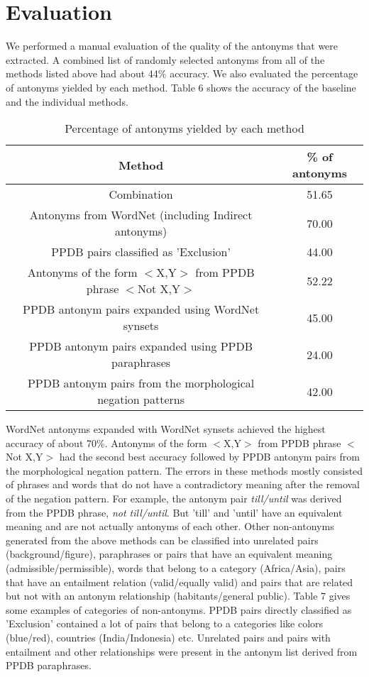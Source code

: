 \documentclass[11pt]{article}
\begin{document}
\section{Evaluation}
We performed a manual evaluation of the quality of the antonyms that were extracted. A combined list of randomly selected antonyms from all of the methods listed above had about 44\% accuracy. We also evaluated the percentage of antonyms yielded by each method. Table 6 shows the accuracy of the baseline and the individual methods.
\begin{table*}[h!]
\centering
 \begin{tabular}{| c | c |} 
 \hline
 Method & \% of antonyms \\ [0.5ex]
 \hline
 Combination & 51.65\\
 Antonyms from WordNet (including Indirect antonyms) & 70.00\\
 PPDB pairs classified as 'Exclusion' & 44.00\\
 Antonyms of the form $<$X,Y$>$ from PPDB phrase $<$Not X,Y$>$ & 52.22\\
 PPDB antonym pairs expanded using WordNet synsets & 45.00\\
 PPDB antonym pairs expanded using PPDB paraphrases & 24.00\\
 PPDB antonym pairs from the morphological negation patterns & 42.00\\
 \hline
\end{tabular}
\caption{Percentage of antonyms yielded by each method}
\end{table*}
WordNet antonyms expanded with WordNet synsets achieved the highest accuracy of about 70\%. Antonyms of the form $<$X,Y$>$ from PPDB phrase $<$Not X,Y$>$ had the second best accuracy followed by PPDB antonym pairs from the morphological negation pattern. The errors in these methods mostly consisted of phrases and words that do not have a contradictory meaning after the removal of the negation pattern. For example, the antonym pair \textit{till/until} was derived from the PPDB phrase, \textit{not till/until}. But 'till' and 'until' have an equivalent meaning and are not actually antonyms of each other. Other non-antonyms generated from the above methods can be classified into unrelated pairs (background/figure), paraphrases or pairs that have an equivalent meaning (admissible/permissible), words that belong to a category (Africa/Asia), pairs that have an entailment relation (valid/equally valid) and pairs that are related but not with an antonym relationship (habitants/general public). Table 7 gives some examples of categories of non-antonyms. PPDB pairs directly classified as 'Exclusion' contained a lot of pairs that belong to a categories like colors (blue/red), countries (India/Indonesia) etc. Unrelated pairs and pairs with entailment and other relationships were present in the antonym list derived from PPDB paraphrases. 
\end{document}
